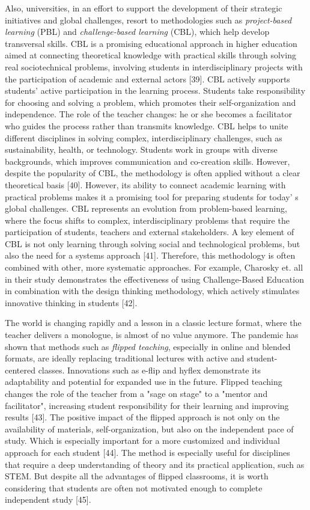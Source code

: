 \begin{multicols}{2}
Also, universities, in an effort to support the development of their
strategic initiatives and global challenges, resort to methodologies
such as \emph{project-based learning} (PBL) and \emph{challenge-based
learning} (CBL), which help develop transversal skills. CBL is a
promising educational approach in higher education aimed at connecting
theoretical knowledge with practical skills through solving real
sociotechnical problems, involving students in interdisciplinary
projects with the participation of academic and external actors
{[}39{]}. CBL actively supports students' active participation in the
learning process. Students take responsibility for choosing and solving
a problem, which promotes their self-organization and independence. The
role of the teacher changes: he or she becomes a facilitator who guides
the process rather than transmits knowledge. CBL helps to unite
different disciplines in solving complex, interdisciplinary challenges,
such as sustainability, health, or technology. Students work in groups
with diverse backgrounds, which improves communication and co-creation
skills. However, despite the popularity of CBL, the methodology is often
applied without a clear theoretical basis {[}40{]}. However, its ability
to connect academic learning with practical problems makes it a
promising tool for preparing students for today' s global
challenges. CBL represents an evolution from problem-based learning,
where the focus shifts to complex, interdisciplinary problems that
require the participation of students, teachers and external
stakeholders. A key element of CBL is not only learning through solving
social and technological problems, but also the need for a systems
approach {[}41{]}. Therefore, this methodology is often combined with
other, more systematic approaches. For example, Charosky et. all in
their study demonstrates the effectiveness of using Challenge-Based
Education in combination with the design thinking methodology, which
actively stimulates innovative thinking in students {[}42{]}.

The world is changing rapidly and a lesson in a classic lecture format,
where the teacher delivers a monologue, is almost of no value anymore.
The pandemic has shown that methods such as \emph{flipped teaching},
especially in online and blended formats, are ideally replacing
traditional lectures with active and student-centered classes.
Innovations such as e-flip and hyflex demonstrate its adaptability and
potential for expanded use in the future. Flipped teaching changes the
role of the teacher from a "sage on stage" to a "mentor and
facilitator", increasing student responsibility for their learning and
improving results {[}43{]}. The positive impact of the flipped approach
is not only on the availability of materials, self-organization, but
also on the independent pace of study. Which is especially important for
a more customized and individual approach for each student {[}44{]}. The
method is especially useful for disciplines that require a deep
understanding of theory and its practical application, such as STEM. But
despite all the advantages of flipped classrooms, it is worth
considering that students are often not motivated enough to complete
independent study {[}45{]}.


\end{multicols}

